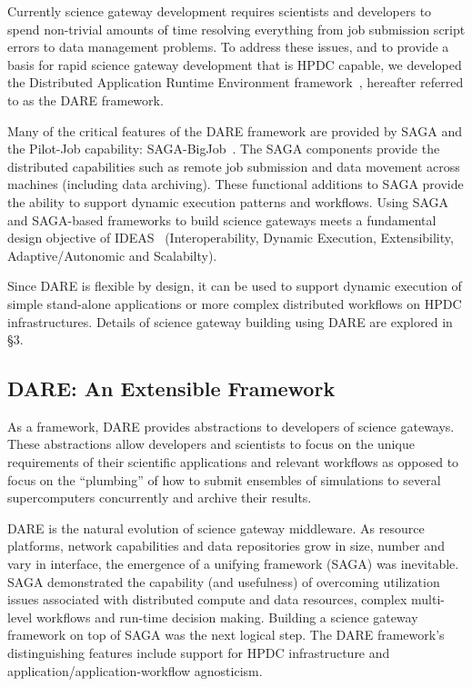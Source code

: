 \documentclass[]{svjour3}
\begin{document}
Currently science gateway development requires scientists and
developers to spend non-trivial amounts of time resolving everything
from job submission script errors to data management problems. To
address these issues, and to provide a basis for rapid science
gateway development that is HPDC capable, we developed the
Distributed Application Runtime Environment
framework~\cite{dareurl}, hereafter referred to as the DARE
framework.

Many of the critical features of the DARE framework are provided by
SAGA and the Pilot-Job capability: SAGA-BigJob~\cite{saga_bigjob_condor_cloud}.
The SAGA components provide the distributed capabilities such as remote job
submission and data movement across machines (including data archiving).
These functional additions to SAGA provide the ability to support dynamic
execution patterns and workflows. Using SAGA and SAGA-based frameworks
to build science gateways meets a fundamental design objective of IDEAS~\cite{ideas}
(Interoperability, Dynamic Execution, Extensibility, Adaptive/Autonomic and Scalabilty).
 
Since DARE is flexible by design, it can be used to support dynamic
execution of simple stand-alone applications or more complex distributed
workflows on HPDC infrastructures. Details of science gateway building
using DARE are explored in \S3.

\subsection{DARE: An Extensible Framework}

As a framework, DARE provides abstractions to developers of science
gateways. These abstractions allow developers and scientists to focus
on the unique requirements of their scientific applications and
relevant workflows as opposed to focus on the ``plumbing'' of how to
submit ensembles of simulations to several supercomputers concurrently
and archive their results.

DARE is the natural evolution of science gateway middleware. As
resource platforms, network capabilities and data repositories grow in
size, number and vary in interface, the emergence of a unifying
framework (SAGA) was inevitable. SAGA demonstrated the capability
(and usefulness) of overcoming utilization issues associated with
distributed compute and data resources, complex multi-level workflows
and run-time decision making. Building a science gateway framework on
top of SAGA was the next logical step. The DARE framework's
distinguishing features include support for HPDC infrastructure and
application/application-workflow agnosticism.
\end{document}
